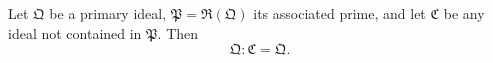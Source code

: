 Let $\mathfrak{Q}$ be a primary ideal, $\mathfrak{P} = \mathfrak{R}(\mathfrak{Q})$ its associated prime, and let $\mathfrak{C}$ be any ideal not contained in $\mathfrak{P}$. Then
$$\mathfrak{Q} : \mathfrak{C} = \mathfrak{Q}.$$
